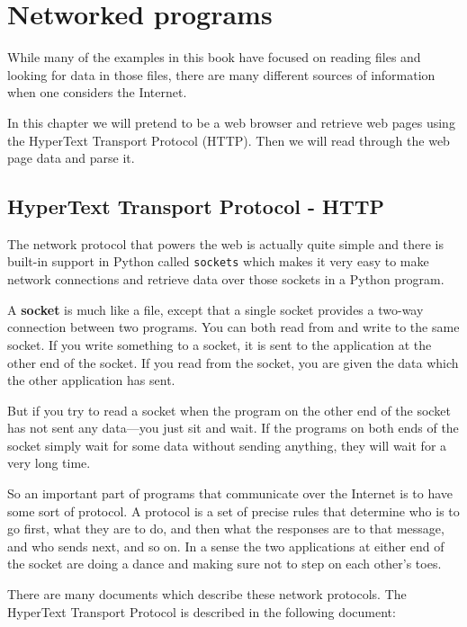 
\chapter{Networked programs}

While many of the examples in this book have focused on reading
files and looking for data in those files, there are many different
sources of information when one considers the Internet.

In this chapter we will pretend to be a web browser and retrieve web
pages using the HyperText Transport Protocol (HTTP).  Then we will read
through the web page data and parse it.

\section{HyperText Transport Protocol - HTTP}

The network protocol that powers the web is actually quite simple and 
there is built-in support in Python called {\tt sockets} which makes it very 
easy to make network connections and retrieve data over those
sockets in a Python program.

A {\bf socket} is much like a file, except that a single  socket 
provides a two-way connection between two programs.  
You can both read from and write to the same socket.  If you write something to 
a socket, it is sent to the application at the other end of the socket.  If you 
read from the socket, you are given the data which the other application has sent.

But if you try to read a socket when the program on the other end of the socket
has not sent any data---you just sit and wait.  If the programs on both ends
of the socket simply wait for some data without sending anything, they will wait for
a very long time.

So an important part of programs that communicate over the Internet is to have some
sort of protocol.   A protocol is a set of precise rules that determine who
is to go first, what they are to do, and then what the responses are to that message,
and who sends next, and so on.  In a sense the two applications at either end 
of the socket are doing a dance and making sure not to step on each other's toes.

There are many documents which describe these network protocols.  The HyperText Transport 
Protocol is described in the following document:

